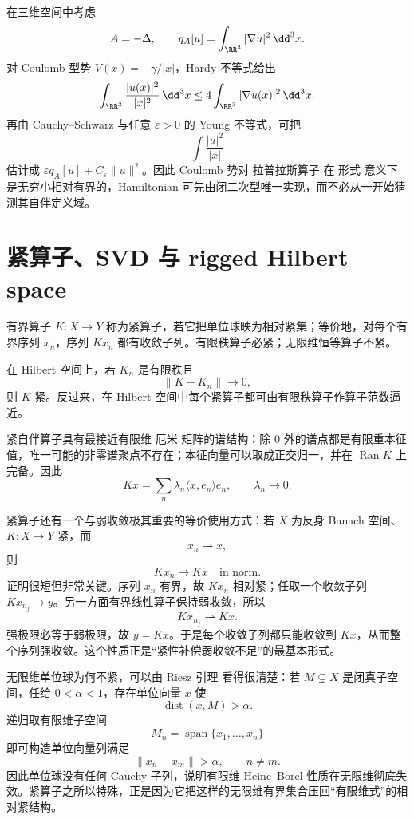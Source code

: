 \begin{exbox}
在三维空间中考虑
\[
A=-\Delta,
\qquad
q_A[u]=\int_{\RR^3}|\nabla u|^2\,\dd^3x.
\]
对 Coulomb 型势 $V(x)=-\gamma/|x|$，Hardy 不等式给出
\[
\int_{\RR^3}\frac{|u(x)|^2}{|x|^2}\,\dd^3x
\le 4\int_{\RR^3}|\nabla u(x)|^2\,\dd^3x.
\]
再由 Cauchy--Schwarz 与任意 $\varepsilon>0$ 的 Young 不等式，可把
\[
\int\frac{|u|^2}{|x|}
\]
估计成 $\varepsilon q_A[u]+C_\varepsilon\|u\|^2$。因此 Coulomb 势对 拉普拉斯算子 在 形式 意义下是无穷小相对有界的，Hamiltonian 可先由闭二次型唯一实现，而不必从一开始猜测其自伴定义域。
\end{exbox}

\section{紧算子、SVD 与 rigged Hilbert space}
有界算子 $K:X\to Y$ 称为紧算子，若它把单位球映为相对紧集；等价地，对每个有界序列 $x_n$，序列 $Kx_n$ 都有收敛子列。有限秩算子必紧；无限维恒等算子不紧。

在 Hilbert 空间上，若 $K_n$ 是有限秩且
\[
\|K-K_n\|\to0,
\]
则 $K$ 紧。反过来，在 Hilbert 空间中每个紧算子都可由有限秩算子作算子范数逼近。

紧自伴算子具有最接近有限维 厄米 矩阵的谱结构：除 $0$ 外的谱点都是有限重本征值，唯一可能的非零谱聚点不存在；本征向量可以取成正交归一，并在 $\overline{\operatorname{Ran}K}$ 上完备。因此
\[
\boxed{Kx=\sum_n\lambda_n\langle x,e_n\rangle e_n},
\qquad \lambda_n\to0.
\]

紧算子还有一个与弱收敛极其重要的等价使用方式：若 $X$ 为反身 Banach 空间、$K:X\to Y$ 紧，而
\[
x_n\rightharpoonup x,
\]
则
\begin{equation*}Kx_n\to Kx
\quad\text{in norm}.\end{equation*}
证明很短但非常关键。序列 $x_n$ 有界，故 $Kx_n$ 相对紧；任取一个收敛子列 $Kx_{n_j}\to y$。另一方面有界线性算子保持弱收敛，所以
\[
Kx_{n_j}\rightharpoonup Kx.
\]
强极限必等于弱极限，故 $y=Kx$。于是每个收敛子列都只能收敛到 $Kx$，从而整个序列强收敛。这个性质正是“紧性补偿弱收敛不足”的最基本形式。

无限维单位球为何不紧，可以由 Riesz 引理 看得很清楚：若 $M\subsetneq X$ 是闭真子空间，任给 $0<\alpha<1$，存在单位向量 $x$ 使
\[
\operatorname{dist}(x,M)>\alpha.
\]
递归取有限维子空间
\[
M_n=\operatorname{span}\{x_1,\ldots,x_n\}
\]
即可构造单位向量列满足
\[
\|x_n-x_m\|>\alpha,
\qquad n\neq m.
\]
因此单位球没有任何 Cauchy 子列，说明有限维 Heine--Borel 性质在无限维彻底失效。紧算子之所以特殊，正是因为它把这样的无限维有界集合压回“有限维式”的相对紧结构。

